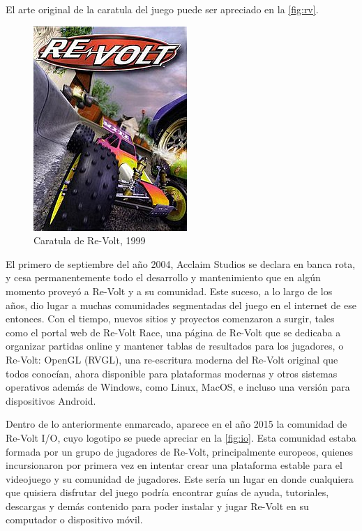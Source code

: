 El arte original de la caratula del juego puede ser apreciado en la \autoref{fig:rv}.

\begin{figure}[H]
  \begin{center}
    \includegraphics{img/re-volt.jpg}
  \end{center}
  \caption[Caratula de Re-Volt, 1999]{Caratula de Re-Volt, 1999}
  \label{fig:rv}
\end{figure}

El primero de septiembre del año 2004, Acclaim Studios se declara en banca rota, y cesa permanentemente todo el desarrollo y mantenimiento que en algún momento proveyó a Re-Volt y a su comunidad. Este suceso, a lo largo de los años, dio lugar a muchas comunidades segmentadas del juego en el internet de ese entonces. Con el tiempo, nuevos sitios y proyectos comenzaron a surgir, tales como el portal web de Re-Volt Race, una página de Re-Volt que se dedicaba a organizar partidas online y mantener tablas de resultados para los jugadores, o Re-Volt: OpenGL (RVGL), una re-escritura moderna del Re-Volt original que todos conocían, ahora disponible para plataformas modernas y otros sistemas operativos además de Windows, como Linux, MacOS, e incluso una versión para dispositivos Android.

Dentro de lo anteriormente enmarcado, aparece en el año 2015 la comunidad de Re-Volt I/O, cuyo logotipo se puede apreciar en la \autoref{fig:io}. Esta comunidad estaba formada por un grupo de jugadores de Re-Volt, principalmente europeos, quienes incursionaron por primera vez en intentar crear una plataforma estable para el videojuego y su comunidad de jugadores. Este sería un lugar en donde cualquiera que quisiera disfrutar del juego podría encontrar guías de ayuda, tutoriales, descargas y demás contenido para poder instalar y jugar Re-Volt en su computador o dispositivo móvil.

